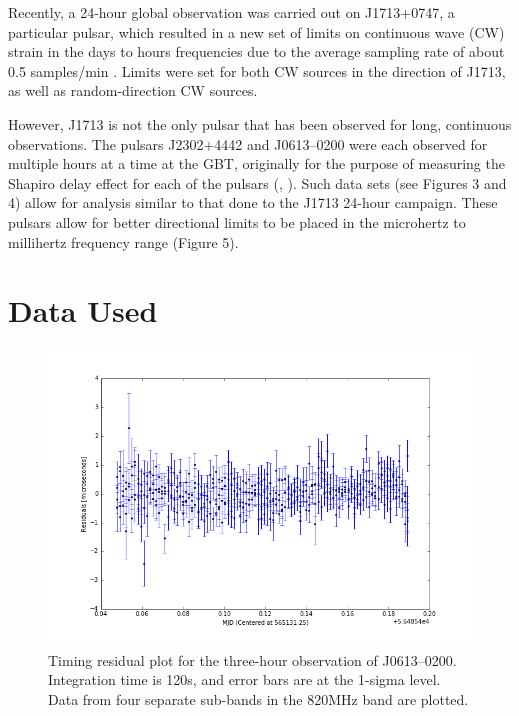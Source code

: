 \documentclass[12pt]{article}
\begin{document}
Recently, a 24-hour global observation was carried out on J1713+0747, a particular pulsar, which
resulted in a new set of limits on continuous wave (CW) strain in the days to
hours frequencies due to the average sampling rate of about 0.5 samples/min
\cite{Dolch2016}.
Limits were set for both CW sources in the direction of J1713, as well as
random-direction CW sources.

  However, J1713 is not the only pulsar that has been observed for long,
continuous observations. The pulsars J2302+4442 and J0613--0200 were each observed for
multiple hours at a time at the GBT, originally for the purpose of measuring the Shapiro
delay effect for each of the pulsars (\cite{Pennucci2015}, \cite{Fonseca2016}). 
Such data sets (see Figures 3 and 4) allow for analysis similar
to that done to the J1713 24-hour campaign. These pulsars allow for better
directional limits to be placed in the microhertz to millihertz frequency range (Figure 5).

\section{Data Used}
 
\begin{figure}[h!]
    \caption{Timing residual plot for the three-hour observation of J0613--0200.
Integration time is 120s, and error bars are at the 1-sigma level. Data from
four separate sub-bands in the 820MHz band are plotted.}
    \includegraphics[width=\textwidth]{./figures/J0613_residuals.png}
\end{figure}
\end{document}
